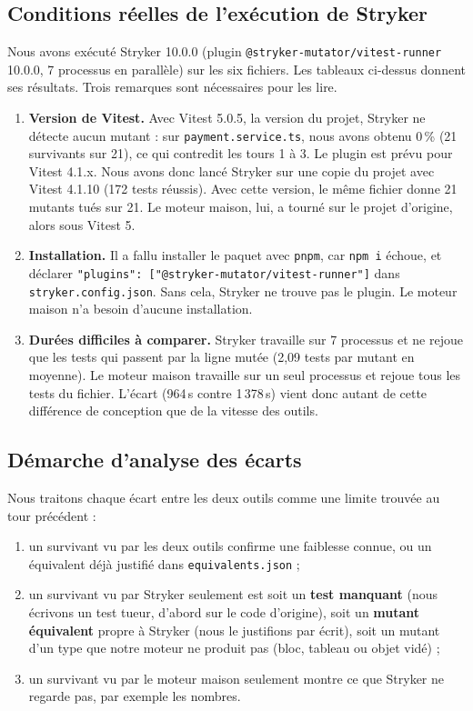 \documentclass[12pt,a4paper]{article}
\begin{document}
\subsection{Conditions réelles de l'exécution de Stryker}
Nous avons exécuté Stryker 10.0.0 (plugin \texttt{@stryker-mutator/vitest-runner} 10.0.0, 7 processus en parallèle) sur les six fichiers. Les tableaux ci-dessus donnent ses résultats. Trois remarques sont nécessaires pour les lire.
\begin{enumerate}
    \item \textbf{Version de Vitest.} Avec Vitest 5.0.5, la version du projet, Stryker ne détecte aucun mutant : sur \texttt{payment.service.ts}, nous avons obtenu 0\,\% (21 survivants sur 21), ce qui contredit les tours 1 à 3. Le plugin est prévu pour Vitest 4.1.x. Nous avons donc lancé Stryker sur une copie du projet avec Vitest 4.1.10 (172 tests réussis). Avec cette version, le même fichier donne 21 mutants tués sur 21. Le moteur maison, lui, a tourné sur le projet d'origine, alors sous Vitest 5.
    \item \textbf{Installation.} Il a fallu installer le paquet avec \texttt{pnpm}, car \texttt{npm i} échoue, et déclarer \texttt{"plugins": ["@stryker-mutator/vitest-runner"]} dans \texttt{stryker.config.json}. Sans cela, Stryker ne trouve pas le plugin. Le moteur maison n'a besoin d'aucune installation.
    \item \textbf{Durées difficiles à comparer.} Stryker travaille sur 7 processus et ne rejoue que les tests qui passent par la ligne mutée (2{,}09 tests par mutant en moyenne). Le moteur maison travaille sur un seul processus et rejoue tous les tests du fichier. L'écart (964\,s contre 1\,378\,s) vient donc autant de cette différence de conception que de la vitesse des outils.
\end{enumerate}

\subsection{Démarche d'analyse des écarts}
Nous traitons chaque écart entre les deux outils comme une limite trouvée au tour précédent :
\begin{enumerate}
    \item un survivant vu par les deux outils confirme une faiblesse connue, ou un équivalent déjà justifié dans \texttt{equivalents.json} ;
    \item un survivant vu par Stryker seulement est soit un \textbf{test manquant} (nous écrivons un test tueur, d'abord sur le code d'origine), soit un \textbf{mutant équivalent} propre à Stryker (nous le justifions par écrit), soit un mutant d'un type que notre moteur ne produit pas (bloc, tableau ou objet vidé) ;
    \item un survivant vu par le moteur maison seulement montre ce que Stryker ne regarde pas, par exemple les nombres.
\end{enumerate}
\end{document}
